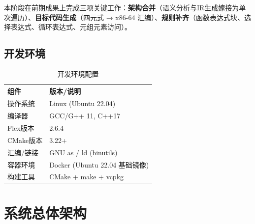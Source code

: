 \documentclass[12pt,a4paper]{ctexart}
\begin{document}
本阶段在前期成果上完成三项关键工作：\textbf{架构合并}（语义分析与IR生成嫁接为单次遍历）、\textbf{目标代码生成}（四元式 → x86-64 汇编）、\textbf{规则补齐}（函数表达式块、选择表达式、循环表达式、元组元素访问）。

\subsection{开发环境}

\begin{table}[H]
\centering
\caption{开发环境配置}
\begin{tabular}{|l|l|}
\hline
\textbf{组件} & \textbf{版本/说明} \\
\hline
操作系统 & Linux (Ubuntu 22.04) \\
\hline 编译器 & GCC/G++ 11, C++17 \\
\hline Flex版本 & 2.6.4 \\
\hline CMake版本 & 3.22+ \\
\hline 汇编/链接 & GNU as / ld (binutils) \\
\hline 容器环境 & Docker (Ubuntu 22.04 基础镜像) \\
\hline 构建工具 & CMake + make + vcpkg \\
\hline
\end{tabular}
\end{table}

\newpage

\section{系统总体架构}
\end{document}
